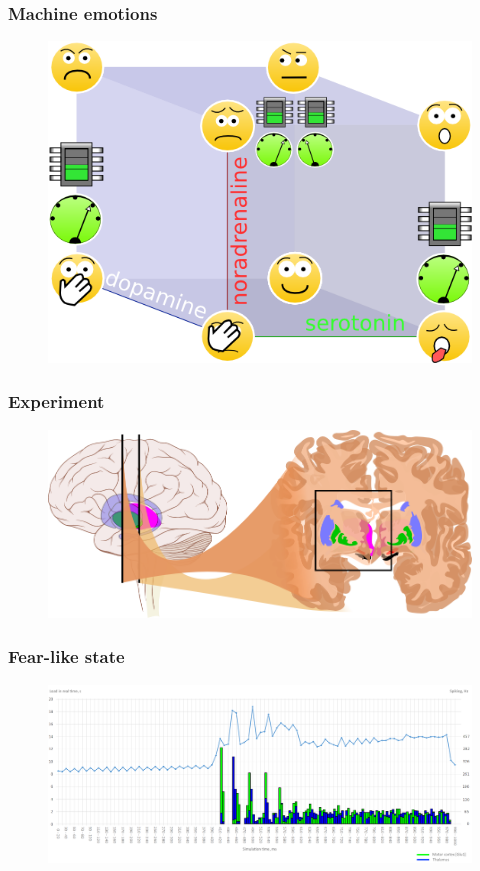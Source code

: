 \documentclass[12pt, aspectratio=169]{beamer}
\begin{document}
\begin{frame}
\frametitle{Machine emotions}
\begin{figure}
\includegraphics[width=0.6\linewidth]{cube_of_emotional_parameters_machine}
\end{figure}
\end{frame}



\begin{frame}
\frametitle{Experiment}
\begin{figure}
\includegraphics[width=1.0\linewidth]{Basal_ganglia_circuits_cropped}
\end{figure}
\end{frame}



\begin{frame}
\frametitle{Fear-like state}
\begin{figure}
\includegraphics[width=1.0\textwidth]{resultBIG}
\end{figure}
\end{frame}
\end{document}
